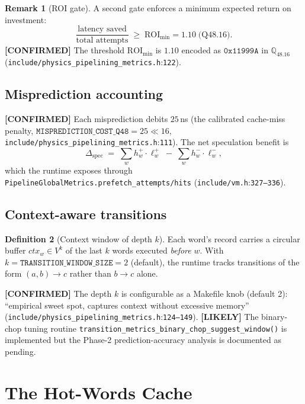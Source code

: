 \documentclass[11pt,letterpaper,openany]{book}
\theoremstyle{definition}
\newtheorem{definition}{Definition}[chapter]
\newtheorem{remark}[definition]{Remark}
\theoremstyle{plain}
\newcommand{\confirmed}{\textcolor{green!50!black}{\textbf{[CONFIRMED]}}\xspace}
\newcommand{\likely}{\textcolor{blue!60!black}{\textbf{[LIKELY]}}\xspace}
\newcommand{\Qfp}{\mathbb{Q}_{48.16}}                %
\newcommand{\sourceref}[2]{\texttt{#1}:\texttt{#2}}
\begin{document}
\begin{remark}[ROI gate]
A second gate enforces a minimum expected return on investment:
\[
  \frac{\text{latency saved}}{\text{total attempts}}
  \;\ge\; \text{ROI}_{\min} = 1.10\;\text{(Q48.16)}.
\]
\confirmed The threshold $\text{ROI}_{\min}$ is $1.10$ encoded as
$\mathtt{0x11999A}$ in $\Qfp$
(\sourceref{include/physics\_pipelining\_metrics.h}{122}).
\end{remark}

\section{Misprediction accounting}

\confirmed Each misprediction debits $25$\,ns (the calibrated cache-miss
penalty, $\mathtt{MISPREDICTION\_COST\_Q48} = 25 \ll 16$,
\sourceref{include/physics\_pipelining\_metrics.h}{111}).
The net speculation benefit is
\begin{equation}\label{eq:specnet}
  \Delta_{\mathrm{spec}}
  \;=\; \sum_w h_w^{+}\cdot\ell_w^{+}
        \;-\; \sum_w h_w^{-}\cdot\ell_w^{-},
\end{equation}
which the runtime exposes through
\texttt{PipelineGlobalMetrics.prefetch\_attempts/hits}
(\sourceref{include/vm.h}{327--336}).

\section{Context-aware transitions}
\label{sec:context}

\begin{definition}[Context window of depth $k$]
Each word's record carries a circular buffer
$\mathit{ctx}_w \in V^k$ of the last $k$ words executed \emph{before} $w$.
With $k = \mathtt{TRANSITION\_WINDOW\_SIZE} = 2$ (default), the runtime
tracks transitions of the form $(a,b)\to c$ rather than $b\to c$ alone.
\end{definition}

\confirmed The depth $k$ is configurable as a Makefile knob (default 2):
``empirical sweet spot, captures context without excessive memory''
(\sourceref{include/physics\_pipelining\_metrics.h}{124--149}).
\likely The binary-chop tuning routine
\texttt{transition\_metrics\_binary\_chop\_suggest\_window()} is implemented
but the Phase-2 prediction-accuracy analysis is documented as pending.

\chapter{The Hot-Words Cache}
\label{ch:hotwords}
\end{document}
